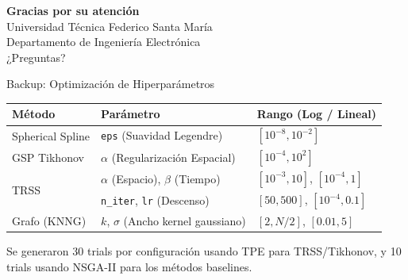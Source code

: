 \documentclass[10pt, aspectratio=169]{beamer}
\begin{document}
\begin{frame}[plain]
    \begin{center}
        \Huge \textbf{Gracias por su atención} \\[1em]
        \large Universidad Técnica Federico Santa María \\
        Departamento de Ingeniería Electrónica \\[2em]
        \Large ¿Preguntas?
    \end{center}
\end{frame}

\appendix
\begin{frame}{Backup: Optimización de Hiperparámetros}
    \begin{center}
    \begin{tabular}{lll}
    \toprule
    \textbf{Método} & \textbf{Parámetro} & \textbf{Rango (Log / Lineal)} \\
    \midrule
    Spherical Spline & \texttt{eps} (Suavidad Legendre) & $[10^{-8}, 10^{-2}]$ \\
    \midrule
    GSP Tikhonov & $\alpha$ (Regularización Espacial) & $[10^{-4}, 10^{2}]$ \\
    \midrule
    \multirow{2}{*}{TRSS} & $\alpha$ (Espacio), $\beta$ (Tiempo) & $[10^{-3}, 10]$, $[10^{-4}, 1]$ \\
                          & \texttt{n\_iter}, \texttt{lr} (Descenso) & $[50, 500]$, $[10^{-4}, 0.1]$ \\
    \midrule
    Grafo (KNNG) & $k$, $\sigma$ (Ancho kernel gaussiano) & $[2, N/2]$, $[0.01, 5]$ \\
    \bottomrule
    \end{tabular}
    \end{center}
    
    \vspace{0.3cm}
    Se generaron 30 trials por configuración usando TPE para TRSS/Tikhonov, y 10 trials usando NSGA-II para los métodos baselines.
\end{frame}
\end{document}
